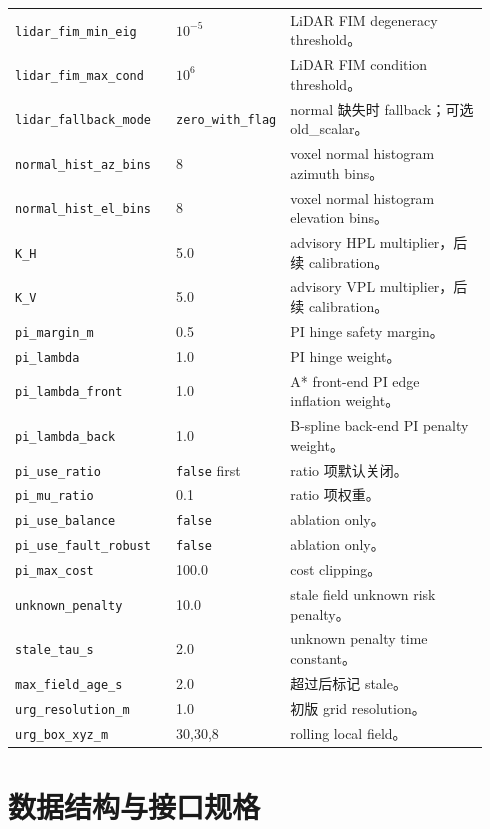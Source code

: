 \documentclass[11pt,a4paper]{article}
\begin{document}
\begin{center}
\begin{longtable}{@{}P{0.34\linewidth}P{0.18\linewidth}P{0.42\linewidth}@{}}
  \texttt{lidar\_fim\_min\_eig} & $10^{-5}$ & LiDAR FIM degeneracy threshold。\\
  \texttt{lidar\_fim\_max\_cond} & $10^6$ & LiDAR FIM condition threshold。\\
  \texttt{lidar\_fallback\_mode} & \texttt{zero\_with\_flag} & normal 缺失时 fallback；可选 old\_scalar。\\
  \texttt{normal\_hist\_az\_bins} & 8 & voxel normal histogram azimuth bins。\\
  \texttt{normal\_hist\_el\_bins} & 8 & voxel normal histogram elevation bins。\\
  \texttt{K\_H} & 5.0 & advisory HPL multiplier，后续 calibration。\\
  \texttt{K\_V} & 5.0 & advisory VPL multiplier，后续 calibration。\\
  \texttt{pi\_margin\_m} & 0.5 & PI hinge safety margin。\\
  \texttt{pi\_lambda} & 1.0 & PI hinge weight。\\
  \texttt{pi\_lambda\_front} & 1.0 & A* front-end PI edge inflation weight。\\
  \texttt{pi\_lambda\_back} & 1.0 & B-spline back-end PI penalty weight。\\
  \texttt{pi\_use\_ratio} & \texttt{false} first & ratio 项默认关闭。\\
  \texttt{pi\_mu\_ratio} & 0.1 & ratio 项权重。\\
  \texttt{pi\_use\_balance} & \texttt{false} & ablation only。\\
  \texttt{pi\_use\_fault\_robust} & \texttt{false} & ablation only。\\
  \texttt{pi\_max\_cost} & 100.0 & cost clipping。\\
  \texttt{unknown\_penalty} & 10.0 & stale field unknown risk penalty。\\
  \texttt{stale\_tau\_s} & 2.0 & unknown penalty time constant。\\
  \texttt{max\_field\_age\_s} & 2.0 & 超过后标记 stale。\\
  \texttt{urg\_resolution\_m} & 1.0 & 初版 grid resolution。\\
  \texttt{urg\_box\_xyz\_m} & 30,30,8 & rolling local field。\\
  \bottomrule
\end{longtable}
\end{center}

\section{数据结构与接口规格}
\end{document}
